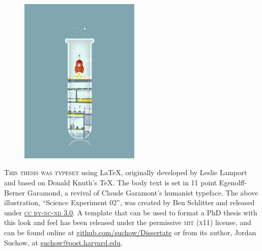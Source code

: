 \newpage

\begin{figure}
  \vspace{50pt}
  \centering
    \includegraphics[width=0.51\textwidth]{endmatter/colophon.png}
\end{figure}


\begin{center}
\parbox{200pt}{\lettrine[lines=3,slope=-2pt,nindent=-4pt]{\textcolor{SchoolColor}{T}}{his thesis was typeset} using \LaTeX, originally developed by Leslie Lamport and based on Donald Knuth's \TeX. The body text is set in 11 point Egenolff-Berner Garamond, a revival of Claude Garamont's humanist typeface. The above illustration, ``Science Experiment 02'', was created by Ben Schlitter and released under \href{http://creativecommons.org/licenses/by-nc-nd/3.0/}{\textsc{cc by-nc-nd 3.0}}. A template that can be used to format a PhD thesis with this look and feel has been released under the permissive \textsc{mit} (\textsc{x}11) license, and can be found online at \href{https://github.com/suchow/Dissertate}{github.com/suchow/Dissertate} or from its author, Jordan Suchow, at \href{mailto:suchow@post.harvard.edu}{suchow@post.harvard.edu}.}
\end{center}